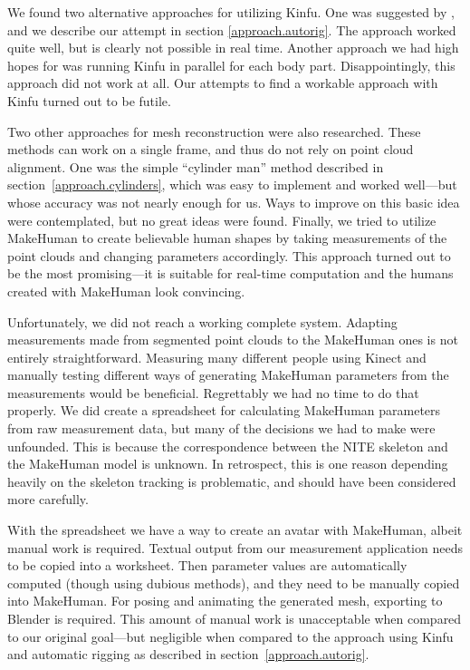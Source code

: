 We found two alternative approaches for utilizing Kinfu. One was suggested by \citet{charpentier2011accurate}, and we describe our attempt in section \ref{approach.autorig}. The approach worked quite well, but is clearly not possible in real time. Another approach we had high hopes for was running Kinfu in parallel for each body part. Disappointingly, this approach did not work at all. Our attempts to find a workable approach with Kinfu turned out to be futile.

Two other approaches for mesh reconstruction were also researched. These methods can work on a single frame, and thus do not rely on point cloud alignment. One was the simple ``cylinder man'' method described in section~\ref{approach.cylinders}, which was easy to implement and worked well---but whose accuracy was not nearly enough for us. Ways to improve on this basic idea were contemplated, but no great ideas were found. Finally, we tried to utilize MakeHuman to create believable human shapes by taking measurements of the point clouds and changing parameters accordingly. This approach turned out to be the most promising---it is suitable for real-time computation and the humans created with MakeHuman look convincing.

Unfortunately, we did not reach a working complete system. Adapting measurements made from segmented point clouds to the MakeHuman ones is not entirely straightforward. Measuring many different people using Kinect and manually testing different ways of generating MakeHuman parameters from the measurements would be beneficial. Regrettably we had no time to do that properly. We did create a spreadsheet for calculating MakeHuman parameters from raw measurement data, but many of the decisions we had to make were unfounded. This is because the correspondence between the NITE skeleton and the MakeHuman model is unknown. In retrospect, this is one reason depending heavily on the skeleton tracking is problematic, and should have been considered more carefully. %

With the spreadsheet we have a way to create an avatar with MakeHuman, albeit manual work is required. Textual output from our measurement application needs to be copied into a worksheet. Then parameter values are automatically computed (though using dubious methods), and they need to be manually copied into MakeHuman. For posing and animating the generated mesh, exporting to Blender is required. This amount of manual work is unacceptable when compared to our original goal---but negligible when compared to the approach using Kinfu and automatic rigging as described in section~\ref{approach.autorig}.

